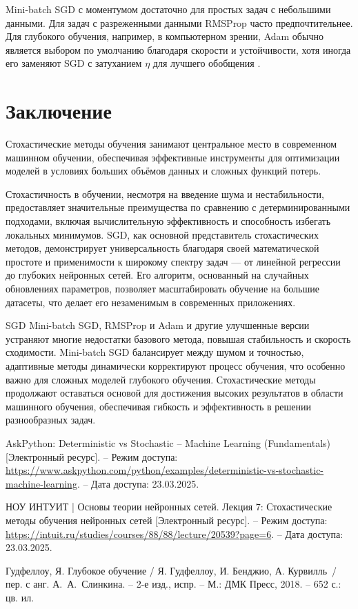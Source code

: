 \documentclass[11pt,a4paper]{article}
\begin{document}
Mini-batch SGD с моментумом достаточно для простых задач с небольшими данными. Для задач с разреженными данными RMSProp часто предпочтительнее. Для глубокого обучения, например, в компьютерном зрении, Adam обычно является выбором по умолчанию благодаря скорости и устойчивости, хотя иногда его заменяют SGD с затуханием \( \eta \) для лучшего обобщения \cite{goodfellow}.


\section*{Заключение}

Стохастические методы обучения занимают центральное место в современном машинном обучении, обеспечивая эффективные инструменты для оптимизации моделей в условиях больших объёмов данных и сложных функций потерь.

Стохастичность в обучении, несмотря на введение шума и нестабильности, предоставляет значительные преимущества по сравнению с детерминированными подходами, включая вычислительную эффективность и способность избегать локальных минимумов. SGD, как основной представитель стохастических методов, демонстрирует универсальность благодаря своей математической простоте и применимости к широкому спектру задач — от линейной регрессии до глубоких нейронных сетей. Его алгоритм, основанный на случайных обновлениях параметров, позволяет масштабировать обучение на большие датасеты, что делает его незаменимым в современных приложениях.

SGD Mini-batch SGD, RMSProp и Adam и другие улучшенные версии устраняют многие недостатки базового метода, повышая стабильность и скорость сходимости. Mini-batch SGD балансирует между шумом и точностью, адаптивные методы динамически корректируют процесс обучения, что особенно важно для сложных моделей глубокого обучения. Стохастические методы продолжают оставаться основой для достижения высоких результатов в области машинного обучения, обеспечивая гибкость и эффективность в решении разнообразных задач.


\begin{thebibliography}{9}
AskPython: Deterministic vs Stochastic -- Machine Learning (Fundamentals) [Электронный ресурс]. -- Режим доступа: \url{https://www.askpython.com/python/examples/deterministic-vs-stochastic-machine-learning}. -- Дата доступа: 23.03.2025.

НОУ ИНТУИТ | Основы теории нейронных сетей. Лекция 7: Стохастические методы обучения нейронных сетей [Электронный ресурс]. -- Режим доступа: \url{https://intuit.ru/studies/courses/88/88/lecture/20539?page=6}. -- Дата доступа: 23.03.2025.

Гудфеллоу, Я. Глубокое обучение / Я. Гудфеллоу, И. Бенджио, А. Курвилль~/ пер. с анг. А.~А.~Слинкина. -- 2-е изд., испр. -- М.: ДМК Пресс, 2018. -- 652 с.: цв. ил.
\end{thebibliography}
\end{document}
